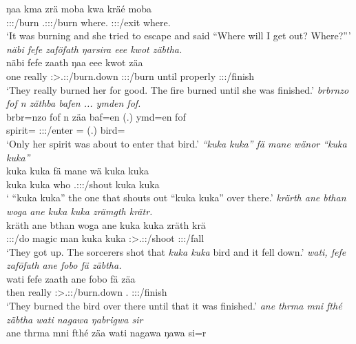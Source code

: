 \begin{exe}
	\gll ŋaa kma zrä moba kwa kräé moba\\
	\Sg:\Sbj:\Pst:\Ipfv/burn {\Pot} \Tsg.\F:\Sbj:\Irr:\Pfv/burn where.{\Abl} {\Fut} \Fsg:\Sbj:\Irr:\Pfv/exit where.{\Abl}\\
	\trans `It was burning and she tried to escape and said ``Where will I get out? Where?'''
	\emph{näbi fefe zaföfath ŋarsira eee kwot zäbtha.}\\
	\gll näbi fefe zaath ŋaa eee kwot zäa\\
	one really \Stpl:\Sbj>\Tsg.\F:\Pst:\Pfv/burn.down \Sg:\Sbj:\Pst:\Ipfv/burn until properly \Sg:\Sbj:\Pst:\Pfv/finish\\
	\trans `They really burned her for good. The fire burned until she was finished.'
	\emph{brbrnzo fof n zäthba bafen ... ymden fof.}\\
	\gll brbr=nzo fof n zäa baf=en (.) ymd=en fof\\
	spirit={\Only} {\Emph} {\Imn} \Sg:\Sbj:\Pst:\Pfv/enter \Recog={\Loc} (.) bird={\Loc} \Emph\\
	\trans `Only her spirit was about to enter that bird.'
	\emph{``kuka kuka'' fä mane wänor ``kuka kuka''}\\
	\gll kuka kuka fä mane wä kuka kuka\\
	kuka kuka {\Dist} who \Tsg.\F:\Sbj:\Nonpast:\Ipfv/shout kuka kuka\\
	\trans ` ``kuka kuka'' the one that shouts out ``kuka kuka'' over there.'
	\emph{krärth ane bthan woga ane kuka kuka zrämgth krätr.}\\
	\gll kräth ane bthan woga ane kuka kuka zräth krä\\
	\Stpl:\Sbj:\Irr:\Pfv/do {\Dem} magic man {\Dem} kuka kuka \Stpl:\Sbj>\Tsg.\F:\Irr:\Pfv/shoot \Stsg:\Sbj:\Irr:\Pfv/fall\\
	\trans `They got up. The sorcerers shot that \emph{kuka kuka} bird and it fell down.'
	\emph{wati, fefe zaföfath ane fobo fä zäbtha.}\\
	\gll wati fefe zaath ane fobo fä zäa\\
	then really \Stpl:\Sbj>\Tsg.\F:\Pst:\Pfv/burn.down {\Dem} \Dist.{\All} {\Dist} \Sg:\Sbj:\Pst:\Pfv/finish\\
	\trans `They burned the bird  over there until that it was finished.'
	\emph{ane thrma mni fthé zäbtha wati nagawa ŋabrigwa sir}\\
	\gll  ane thrma mni fthé zäa wati nagawa ŋawa si=r\\

\end{exe}
